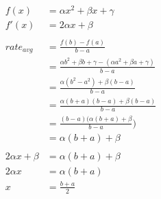 \documentclass[fleqn]{exam}
\begin{document}
\begin{solution}
\begin{align*}
  f(x) &= \alpha x^2 + \beta x + \gamma \\
  f'(x) &= 2 \alpha x + \beta \\
\\
  rate_{avg} &= \frac{f(b) - f(a)}{b - a} \\
            &= \frac{\alpha b^2 + \beta b + \gamma - (\alpha a^2 + \beta a + \gamma)}{b - a} \\
            &= \frac{\alpha(b^2 - a^2) + \beta(b - a)}{b - a} \\
            &= \frac{\alpha(b + a)(b - a) + \beta(b - a)}{b - a} \\
            &= \frac{(b - a) (\alpha(b + a) + \beta}{b - a} ) \\
            &= \alpha(b + a) + \beta \\
\\
  2 \alpha x + \beta &= \alpha(b + a) + \beta \\
  2 \alpha x &= \alpha(b + a) \\
  x &= \frac{b + a}{2} \\
\end{align*}

\end{solution}

\ifprintanswers
\pagebreak
\fi





\ifprintanswers
\pagebreak
\end{document}
